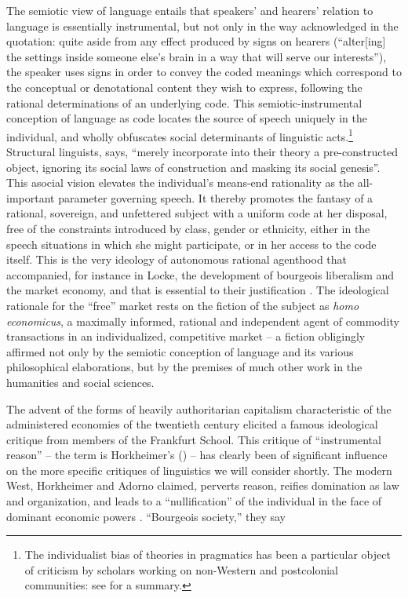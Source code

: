 \documentclass[output=paper]{langscibook}
\begin{document}
\noindent The semiotic view of language entails that speakers' and hearers' relation to language is essentially instrumental, but not only in the way acknowledged in the quotation: quite aside from any effect produced by signs on hearers (``alter[ing] the settings inside someone else’s brain in a way that will serve our interests''), the speaker uses signs in order to convey the coded meanings which correspond to the conceptual or denotational content they wish to express, following the rational determinations of an underlying code. This semiotic-instrumental conception of language as code locates the source of speech uniquely in the individual, and wholly obfuscates social determinants of linguistic acts.\footnote{The individualist bias of theories in pragmatics has been a particular object of criticism by scholars working on non-Western and postcolonial communities: see \citet{AnchimbeJanney2017} for a summary.} Structural linguists, \citet[44]{Bourdieu1991} says, ``merely incorporate into their theory a pre-constructed object, ignoring its social laws of construction and masking its social genesis''. This asocial vision elevates the individual's means-end rationality as the all-important parameter governing speech. It thereby promotes the fantasy of a rational, sovereign, and unfettered subject with a uniform code at her disposal, free of the constraints introduced by class, gender or ethnicity, either in the speech situations in which she might participate, or in her access to the code itself. This is the very ideology of autonomous rational agenthood that accompanied, for instance in Locke, the development of bourgeois liberalism and the market economy, and that is essential to their justification \citep{Losurdo2014}. The ideological rationale for the ``free'' market rests on the fiction of the subject as \emph{homo economicus}, a maximally informed, rational and independent agent of commodity transactions in an individualized, competitive market -- a fiction obligingly affirmed not only by the semiotic conception of language and its various philosophical elaborations, but by the premises of much other work in the humanities and social sciences.

The advent of the forms of heavily authoritarian capitalism characteristic of the administered economies of the twentieth century elicited a famous ideological critique from members of the Frankfurt School. This critique of ``instrumental reason'' -- the term is Horkheimer’s (\citeyear{Horkheimer19921947}) -- has clearly been of significant influence on the more specific critiques of linguistics we will consider shortly. The modern West, Horkheimer and Adorno claimed, perverts reason, reifies domination as law and organization, and leads to a ``nullification'' of the individual in the face of dominant economic powers \citep[xvii]{HorkheimerAdorno20021944}. ``Bourgeois society,'' they say
\end{document}
